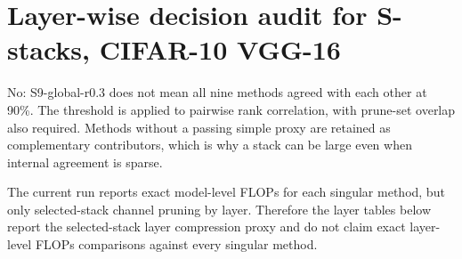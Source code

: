 \documentclass[10pt]{article}
\begin{document}
\section*{Layer-wise decision audit for S-stacks, CIFAR-10 VGG-16}
No: S9-global-r0.3 does not mean all nine methods agreed with each other at 90\%. The threshold is applied to pairwise rank correlation, with prune-set overlap also required. Methods without a passing simple proxy are retained as complementary contributors, which is why a stack can be large even when internal agreement is sparse.
\par The current run reports exact model-level FLOPs for each singular method, but only selected-stack channel pruning by layer. Therefore the layer tables below report the selected-stack layer compression proxy and do not claim exact layer-level FLOPs comparisons against every singular method.
\end{document}
